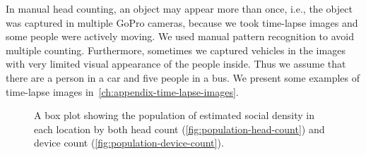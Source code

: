 In manual head counting, an object may appear more than once, i.e., the object was captured in multiple GoPro cameras, because we took time-lapse images and some people were actively moving. We used manual pattern recognition to avoid multiple counting. Furthermore, sometimes we captured vehicles in the images with very limited visual appearance of the people inside. Thus we assume that there are a person in a car and five people in a bus. We present some examples of time-lapse images in~\autoref{ch:appendix-time-lapse-images}.

\begin{figure}[h]
	\begin{adjustwidth}{-2cm}{}
	\centering
	\end{adjustwidth}
	\caption{A box plot showing the population of estimated social density in each location by both head count (\ref{fig:population-head-count}) and device count (\ref{fig:population-device-count}).}
	\label{fig:total-population}
\end{figure}

